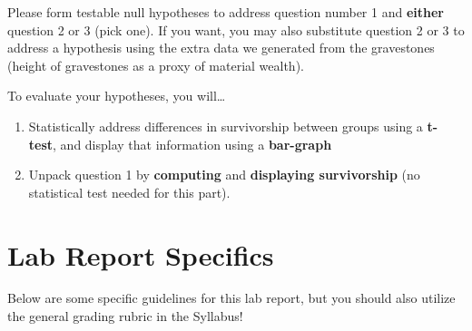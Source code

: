 \documentclass[]{book}
\providecommand{\tightlist}{%
  \setlength{\itemsep}{0pt}\setlength{\parskip}{0pt}}
\theoremstyle{definition}
\theoremstyle{definition}
\theoremstyle{definition}
\theoremstyle{remark}
\begin{document}
Please form testable null hypotheses to address question number 1 and
\textbf{either} question 2 or 3 (pick one). If you want, you may also
substitute question 2 or 3 to address a hypothesis using the extra data
we generated from the gravestones (height of gravestones as a proxy of
material wealth).

To evaluate your hypotheses, you will\ldots{}

\begin{enumerate}
\def\labelenumi{\arabic{enumi}.}
\tightlist
\item
  Statistically address differences in survivorship between groups using
  a \textbf{t-test}, and display that information using a
  \textbf{bar-graph}
\item
  Unpack question 1 by \textbf{computing} and \textbf{displaying
  survivorship} (no statistical test needed for this part).
\end{enumerate}

\pagebreak

\section{Lab Report Specifics}\label{lab-report-specifics}

Below are some specific guidelines for this lab report, but you should
also utilize the general grading rubric in the Syllabus!
\end{document}
